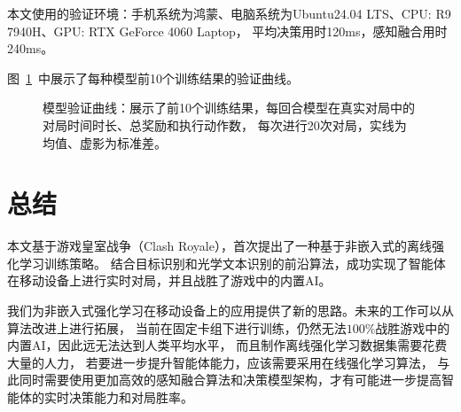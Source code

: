 \documentclass[openany,twoside,nofonts,AutoFakeBold,UTF8]{ctexbook}
\begin{document}
本文使用的验证环境：手机系统为鸿蒙、电脑系统为Ubuntu24.04 LTS、CPU: R9 7940H、GPU: RTX GeForce 4060 Laptop，
平均决策用时120ms，感知融合用时240ms。

图~\ref{fig-model-eval}~中展示了每种模型前10个训练结果的验证曲线。

\begin{figure}[h!]
  \centering
  \setlength{\abovecaptionskip}{0ex}  %
  \caption{模型验证曲线：展示了前10个训练结果，每回合模型在真实对局中的对局时间时长、总奖励和执行动作数，
  每次进行20次对局，实线为均值、虚影为标准差。}\label{fig-model-eval}
\end{figure}

\section{总结}

本文基于游戏皇室战争（Clash Royale），首次提出了一种基于非嵌入式的离线强化学习训练策略。
结合目标识别和光学文本识别的前沿算法，成功实现了智能体在移动设备上进行实时对局，并且战胜了游戏中的内置AI。

我们为非嵌入式强化学习在移动设备上的应用提供了新的思路。未来的工作可以从算法改进上进行拓展，
当前在固定卡组下进行训练，仍然无法$100\%$战胜游戏中的内置AI，因此远无法达到人类平均水平，
而且制作离线强化学习数据集需要花费大量的人力，
若要进一步提升智能体能力，应该需要采用在线强化学习算法，
与此同时需要使用更加高效的感知融合算法和决策模型架构，才有可能进一步提高智能体的实时决策能力和对局胜率。
\end{document}
